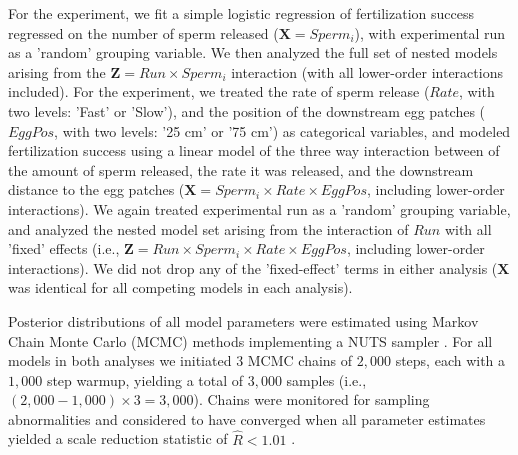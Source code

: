 \documentclass{article}
\begin{document}
	For the  experiment, we fit a simple logistic regression of fertilization success regressed on the number of sperm released ($\mathbf{X} = Sperm_i$), with experimental run as a 'random' grouping variable. We then analyzed the full set of nested models arising from the $\mathbf{Z} = Run \times Sperm_i$ interaction (with all lower-order interactions included). For the  experiment, we treated the rate of sperm release ($Rate$, with two levels: 'Fast' or 'Slow'), and the position of the downstream egg patches ($EggPos$, with two levels: '25 cm' or '75 cm') as categorical variables, and modeled fertilization success using a linear model of the three way interaction between of the amount of sperm released, the rate it was released, and the downstream distance to the egg patches ($ \mathbf{X} = Sperm_i \times Rate \times EggPos$, including lower-order interactions). We again treated experimental run as a 'random' grouping variable, and analyzed the nested model set arising from the interaction of $Run$ with all 'fixed' effects (i.e., $\mathbf{Z} = Run \times Sperm_i \times Rate \times EggPos$, including lower-order interactions). We did not drop any of the 'fixed-effect' terms in either analysis ($\mathbf{X}$ was identical for all competing models in each analysis).

	Posterior distributions of all model parameters were estimated using Markov Chain Monte Carlo (MCMC) methods implementing a NUTS sampler \citep{Stan2016}. For all models in both analyses we initiated $3$ MCMC chains of $2,000$ steps, each with a $1,000$ step warmup, yielding a total of $3,000$ samples (i.e., $(2,000 - 1,000) \times 3 = 3,000$). Chains were monitored for sampling abnormalities and considered to have converged when all parameter estimates yielded a scale reduction statistic of $\hat{R} < 1.01$ \citep{GelmanRubin1992}.
\end{document}
